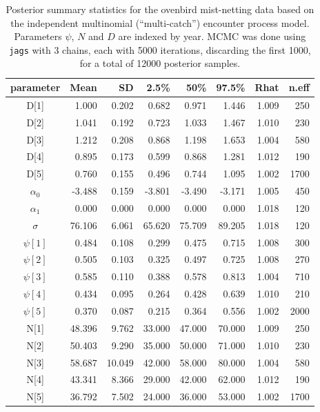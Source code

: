 \begin{table}[t!]
\centering
  \small
  \caption{Posterior summary statistics
for the ovenbird mist-netting data based on the
    independent multinomial (``multi-catch'') encounter process
    model. Parameters $\psi$, $N$ and $D$ are indexed by
    year.
MCMC was done using
    {\tt jags} with 3 chains, each with 5000 iterations, discarding
    the first 1000, for a total of 12000 posterior samples.}
  \begin{tabular}[t]{crrrrrrr}
    \hline \hline
parameter   &  Mean &  SD &  2.5\%  &  50\%  &  97.5\%  & Rhat &  n.eff \\
    \hline
D[1]  &   1.000 &  0.202&  0.682&  0.971&  1.446& 1.009 &  250\\
D[2]  &   1.041 &  0.192&  0.723&  1.033&  1.467& 1.010 &  230\\
D[3]  &   1.212 &  0.208&  0.868&  1.198&  1.653& 1.004 &  580\\
D[4]  &   0.895 &  0.173&  0.599&  0.868&  1.281& 1.012 &  190\\
D[5]  &   0.760 &  0.155&  0.496&  0.744&  1.095& 1.002 & 1700\\
$\alpha_0$&  -3.488 &  0.159& -3.801& -3.490& -3.171& 1.005 &  450 \\
$\alpha_1$&   0.000 &  0.000&  0.000&  0.000&  0.000& 1.018 &  120 \\
$\sigma$ &  76.106 &  6.061& 65.620& 75.709& 89.205& 1.018 &  120\\
$\psi[1]$&   0.484 &  0.108&  0.299&  0.475&  0.715& 1.008 &  300\\
$\psi[2]$&  0.505 &  0.103&  0.325&  0.497&  0.725& 1.008 &  270\\
$\psi[3]$&   0.585 &  0.110&  0.388&  0.578&  0.813& 1.004 &  710\\
$\psi[4]$&   0.434 &  0.095&  0.264&  0.428&  0.639& 1.010 &  210\\
$\psi[5]$&   0.370 &  0.087&  0.215&  0.364&  0.556& 1.002 & 2000\\
N[1]  &  48.396 &  9.762& 33.000& 47.000& 70.000& 1.009 &  250\\
N[2]  &  50.403 &  9.290& 35.000& 50.000& 71.000& 1.010 &  230\\
N[3]  &  58.687 & 10.049& 42.000& 58.000& 80.000& 1.004 &  580\\
N[4]  &  43.341 &  8.366& 29.000& 42.000& 62.000& 1.012 &  190\\
N[5]  &  36.792 &  7.502& 24.000& 36.000& 53.000& 1.002 & 1700\\
\hline
  \end{tabular}
  \label{scrovenbird.results}
\end {table}




